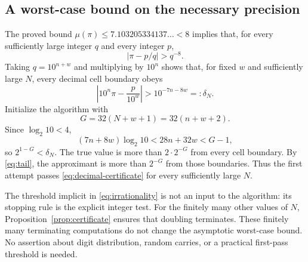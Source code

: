 \documentclass[11pt]{article}
\numberwithin{equation}{section}
\theoremstyle{definition}
\begin{document}
\subsection{A worst-case bound on the necessary precision}

The proved bound $\mu(\pi)\le7.103205334137\ldots<8$
\cite{ZZ20} implies that, for every sufficiently large
integer $q$ and every integer $p$,
\begin{equation}\label{eq:irrationality}
 |\pi-p/q|>q^{-8}.
\end{equation}
Taking $q=10^{n+w}$ and multiplying by $10^n$ shows that,
for fixed $w$ and sufficiently large $N$, every decimal
cell boundary obeys
\begin{equation}\label{eq:boundary-distance}
 \left|10^n\pi-\frac{p}{10^w}\right|
 >10^{-7n-8w}=:\delta_N .
\end{equation}
Initialize the algorithm with
\begin{equation}\label{eq:guard}
 G=32(N+w+1)=32(n+w+2).
\end{equation}
Since $\log_2 10<4$,
\[
 (7n+8w)\log_2 10
 <28n+32w<G-1,
\]
so $2^{1-G}<\delta_N$.
The true value is more than $2\cdot2^{-G}$ from every
cell boundary. By \eqref{eq:tail}, the approximant is
more than $2^{-G}$ from those boundaries. Thus the first
attempt passes \eqref{eq:decimal-certificate} for every
sufficiently large $N$.

The threshold implicit in \eqref{eq:irrationality} is not
an input to the algorithm: its stopping rule is the explicit
integer test. For the finitely many other values of $N$,
Proposition~\ref{prop:certificate} ensures that doubling
terminates. These finitely many terminating computations
do not change the asymptotic worst-case bound. No assertion
about digit distribution, random carries, or a practical
first-pass threshold is needed.
\end{document}
